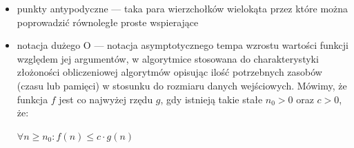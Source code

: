 \documentclass{article}
\begin{document}
\begin{itemize}
\item{punkty antypodyczne} --- taka para wierzchołków wielokąta przez
  które można poprowadzić równoległe proste wspierające

\item{notacja dużego O} --- notacja asymptotycznego tempa wzrostu
  wartości funkcji względem jej argumentów, w algorytmice stosowana do
  charakterystyki złożoności obliczeniowej algorytmów opisując ilość
  potrzebnych zasobów (czasu lub pamięci) w stosunku do rozmiaru
  danych wejściowych. Mówimy, że funkcja $f$ jest co najwyżej rzędu
  $g$, gdy istnieją takie stałe $n_0 > 0$ oraz $c > 0$, że:

  \begin{center}
    $\forall n \geq n_0 : f(n) \leq c \cdot g(n)$
  \end{center}

\end{itemize}
\end{document}
